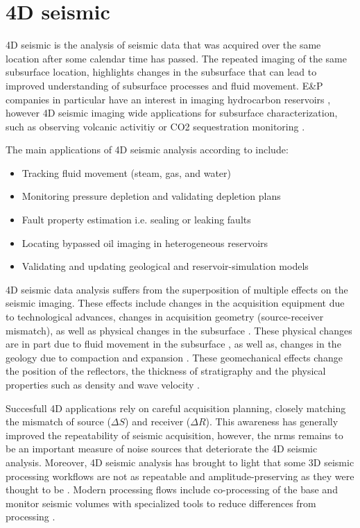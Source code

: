 \section{4D seismic}

4D seismic is the analysis of seismic data that was acquired over the same location after some calendar time has passed. The repeated imaging of the same subsurface location, highlights changes in the subsurface that can lead to improved understanding of subsurface processes and fluid movement. E\&P companies in particular have an interest in imaging hydrocarbon reservoirs \citep{Johnston2013-jg}, however 4D seismic imaging wide applications for subsurface characterization, such as observing volcanic activitiy \citep{londono20184d} or CO2 sequestration monitoring \citep{Arts2004-ym}. 

The main applications of 4D seismic analysis according to \citet{Yilmaz2003-hp,Johnston2013-qg} include:
\begin{itemize}
\item Tracking fluid movement (steam, gas, and water)
\item Monitoring pressure depletion and validating depletion plans
\item Fault property estimation i.e. sealing or leaking faults
\item Locating bypassed oil imaging in heterogeneous reservoirs
\item Validating and updating geological and reservoir-simulation models
\end{itemize}

4D seismic data analysis suffers from the superposition of multiple effects on the seismic imaging. These effects include changes in the acquisition equipment due to technological advances, changes in acquisition geometry (source-receiver mismatch), as well as physical changes in the subsurface \citet{Yilmaz2003-hp, Johnston2013-jg}. These physical changes are in part due to fluid movement in the subsurface \citep{lumley1995seismic}, as well as, changes in the geology due to compaction and expansion \citep{Hatchell2005-op}. These geomechanical effects change the position of the reflectors, the thickness of stratigraphy and the physical properties such as density and wave velocity \citep{Herwanger2015-qz}.

Succesfull 4D applications rely on careful acquisition planning, closely matching the mismatch of source ($\Delta S$) and receiver ($\Delta R$). This awareness has generally improved the repeatability of seismic acquisition, however, the \ac{nrms} remains to be an important measure of noise sources that deteriorate the 4D seismic analysis. Moreover, 4D seismic analysis has brought to light that some 3D seismic processing workflows are not as repeatable and amplitude-preserving as they were thought to be \citep{Lumley2001-kx}. Modern processing flows include co-processing of the base and monitor seismic volumes with specialized tools to reduce differences from processing \citep{Johnston2013-qg}.

